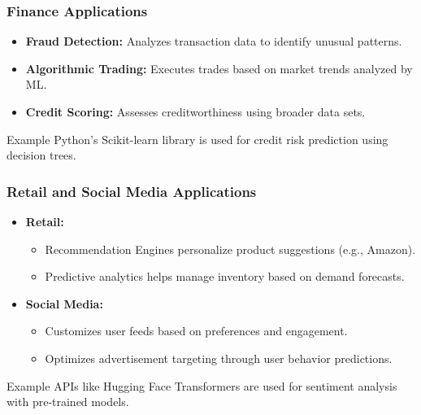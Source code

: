 \documentclass[aspectratio=169]{beamer}
\begin{document}
\begin{frame}[fragile]
    \frametitle{Finance Applications}
    \begin{itemize}
        \item \textbf{Fraud Detection:} Analyzes transaction data to identify unusual patterns.
        \item \textbf{Algorithmic Trading:} Executes trades based on market trends analyzed by ML.
        \item \textbf{Credit Scoring:} Assesses creditworthiness using broader data sets.
    \end{itemize}
    \begin{block}{Example}
        Python's Scikit-learn library is used for credit risk prediction using decision trees.
    \end{block}
\end{frame}

\begin{frame}[fragile]
    \frametitle{Retail and Social Media Applications}
    \begin{itemize}
        \item \textbf{Retail:}
            \begin{itemize}
                \item Recommendation Engines personalize product suggestions (e.g., Amazon).
                \item Predictive analytics helps manage inventory based on demand forecasts.
            \end{itemize}
        \item \textbf{Social Media:}
            \begin{itemize}
                \item Customizes user feeds based on preferences and engagement.
                \item Optimizes advertisement targeting through user behavior predictions.
            \end{itemize}
    \end{itemize}
    \begin{block}{Example}
        APIs like Hugging Face Transformers are used for sentiment analysis with pre-trained models.
    \end{block}
\end{frame}
\end{document}
